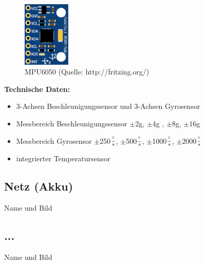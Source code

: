 \begin{figure}[!h]  %

	\centering\includegraphics[width=0.2\textwidth]{images/MPU6050.PNG}
	\caption{MPU6050  \newline (Quelle: http://fritzing.org/)}
	\label{MPU6050}

\end{figure}
\textbf{Technische Daten:}

\begin{itemize}
	\item 3-Achsen Beschleunigungssensor und 3-Achsen Gyrosensor
	\item Messbereich Beschleunigungssensor $\pm$2g, $\pm$4g , $\pm$8g, $\pm$16g
	\item Messbereich Gyrosensor $\pm$250$\frac{\degree}{s}$, $\pm$500$\frac{\degree}{s}$, $\pm$1000$\frac{\degree}{s}$, $\pm$2000$\frac{\degree}{s}$
	\item integrierter Temperatursensor

\end{itemize}


\subsection{Netz (Akku)}

 Name und Bild

 \subsection{...}

 Name und Bild

\newpage
